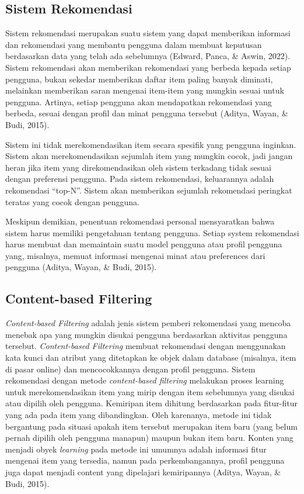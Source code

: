 \subsection{Sistem Rekomendasi}
Sistem rekomendasi merupakan suatu sistem yang dapat memberikan informasi dan rekomendasi yang membantu pengguna dalam membuat keputusan berdasarkan data yang telah ada sebelumnya
  {(Edward, Panca, \& Aswin, 2022)}. Sistem rekomendasi akan memberikan rekomendasi yang berbeda kepada setiap pengguna, bukan sekedar memberikan daftar item paling banyak diminati, melainkan memberikan
saran mengenai item-item yang mungkin sesuai untuk pengguna. Artinya, setiap pengguna akan mendapatkan rekomendasi yang berbeda, sesuai dengan profil dan minat
pengguna tersebut {(Aditya, Wayan, \& Budi, 2015)}.

Sistem ini tidak merekomendasikan item secara spesifik yang pengguna inginkan. Sistem akan merekomendasikan sejumlah item yang mungkin cocok, jadi jangan heran jika
item yang direkomendasikan oleh sistem terkadang tidak sesuai dengan preferensi pengguna. Pada sistem rekomendasi, keluarannya adalah rekomendasi “top-N”. Sistem akan memberikan sejumlah
rekomendasi peringkat teratas yang cocok dengan pengguna.

Meskipun demikian, penentuan rekomendasi personal mensyaratkan bahwa sistem harus memiliki pengetahuan tentang pengguna. Setiap system rekomendasi harus membuat dan
memaintain suatu model pengguna atau profil pengguna yang, misalnya, memuat informasi mengenai minat atau preferences dari pengguna {(Aditya, Wayan, \& Budi, 2015)}.

\subsection{Content-based Filtering}
\emph{Content-based Filtering} adalah jenis sistem pemberi rekomendasi yang mencoba menebak apa yang mungkin disukai pengguna berdasarkan aktivitas pengguna tersebut. \emph{Content-based Filtering}
membuat rekomendasi dengan menggunakan kata kunci dan atribut yang ditetapkan ke objek dalam database (misalnya, item di pasar online) dan mencocokkannya dengan profil pengguna.
Sistem rekomendasi dengan metode \emph{content-based filtering} melakukan proses learning untuk merekomendasikan item yang mirip dengan item sebelumnya
yang disukai atau dipilih oleh pengguna. Kemiripan item dihitung berdasarkan pada fitur-fitur yang ada pada item yang dibandingkan. Oleh karenanya, metode ini tidak bergantung
pada situasi apakah item tersebut merupakan item baru {(yang belum pernah dipilih oleh pengguna manapun)} maupun bukan item baru. Konten yang menjadi obyek \emph{learning} pada
metode ini umumnya adalah informasi fitur mengenai item yang tersedia, namun pada perkembangannya, profil pengguna juga dapat menjadi content yang dipelajari
kemiripannya {(Aditya, Wayan, \& Budi, 2015)}.

